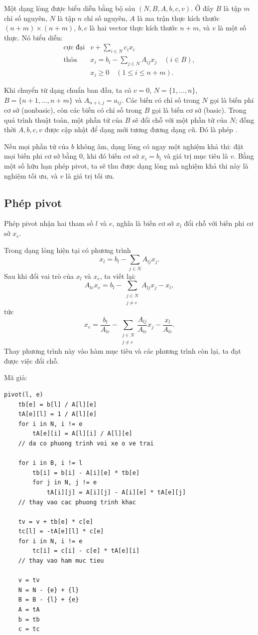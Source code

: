 \documentclass[11pt]{article}
\begin{document}
Một dạng lỏng được biểu diễn bằng bộ sáu $(N,B,A,b,c,v)$. Ở đây $B$ là tập
$m$ chỉ số nguyên, $N$ là tập $n$ chỉ số nguyên, $A$ là ma trận thực kích
thước $(n+m)\times(n+m)$, $b,c$ là hai vector thực kích thước $n+m$, và $v$
là một số thực. Nó biểu diễn:
\[
\begin{array}{ll}
\text{cực đại} & \displaystyle v+\sum_{i\in N} c_ix_i\\
\text{thỏa} & \displaystyle
x_i=b_i-\sum_{j\in N} A_{ij}x_j\quad (i\in B),\\
& x_i\ge 0\quad (1\le i\le n+m).
\end{array}
\]

Khi chuyển từ dạng chuẩn ban đầu, ta có $v=0$, $N=\{1,\ldots,n\}$,
$B=\{n+1,\ldots,n+m\}$ và $A_{n+i,j}=a_{ij}$. Các biến có chỉ số trong $N$
gọi là biến phi cơ sở (nonbasic), còn các biến có chỉ số trong $B$ gọi là
biến cơ sở (basic). Trong quá trình thuật toán, một phần tử của $B$ sẽ đổi
chỗ với một phần tử của $N$; đồng thời $A,b,c,v$ được cập nhật để dạng mới
tương đương dạng cũ. Đó là phép .

Nếu mọi phần tử của $b$ không âm, dạng lỏng có ngay một nghiệm khả thi: đặt
mọi biến phi cơ sở bằng $0$, khi đó biến cơ sở $x_i=b_i$ và giá trị mục tiêu
là $v$. Bằng một số hữu hạn phép pivot, ta sẽ thu được dạng lỏng mà nghiệm
khả thi này là nghiệm tối ưu, và $v$ là giá trị tối ưu.

\subsection{Phép pivot}

Phép pivot nhận hai tham số $l$ và $e$, nghĩa là biến cơ sở $x_l$ đổi chỗ với
biến phi cơ sở $x_e$.

Trong dạng lỏng hiện tại có phương trình
\[
  x_l=b_l-\sum_{j\in N} A_{lj}x_j.
\]
Sau khi đổi vai trò của $x_l$ và $x_e$, ta viết lại:
\[
  A_{le}x_e=b_l-\sum_{\substack{j\in N\\j\ne e}} A_{lj}x_j-x_l,
\]
tức
\[
  x_e=\frac{b_l}{A_{le}}
      -\sum_{\substack{j\in N\\j\ne e}}\frac{A_{lj}}{A_{le}}x_j
      -\frac{x_l}{A_{le}}.
\]
Thay phương trình này vào hàm mục tiêu và các phương trình còn lại, ta đạt
được việc đổi chỗ.

Mã giả:
\begin{verbatim}
pivot(l, e)
    tb[e] = b[l] / A[l][e]
    tA[e][l] = 1 / A[l][e]
    for i in N, i != e
        tA[e][i] = A[l][i] / A[l][e]
    // da co phuong trinh voi xe o ve trai

    for i in B, i != l
        tb[i] = b[i] - A[i][e] * tb[e]
        for j in N, j != e
            tA[i][j] = A[i][j] - A[i][e] * tA[e][j]
    // thay vao cac phuong trinh khac

    tv = v + tb[e] * c[e]
    tc[l] = -tA[e][l] * c[e]
    for i in N, i != e
        tc[i] = c[i] - c[e] * tA[e][i]
    // thay vao ham muc tieu

    v = tv
    N = N - {e} + {l}
    B = B - {l} + {e}
    A = tA
    b = tb
    c = tc
\end{verbatim}
\end{document}
